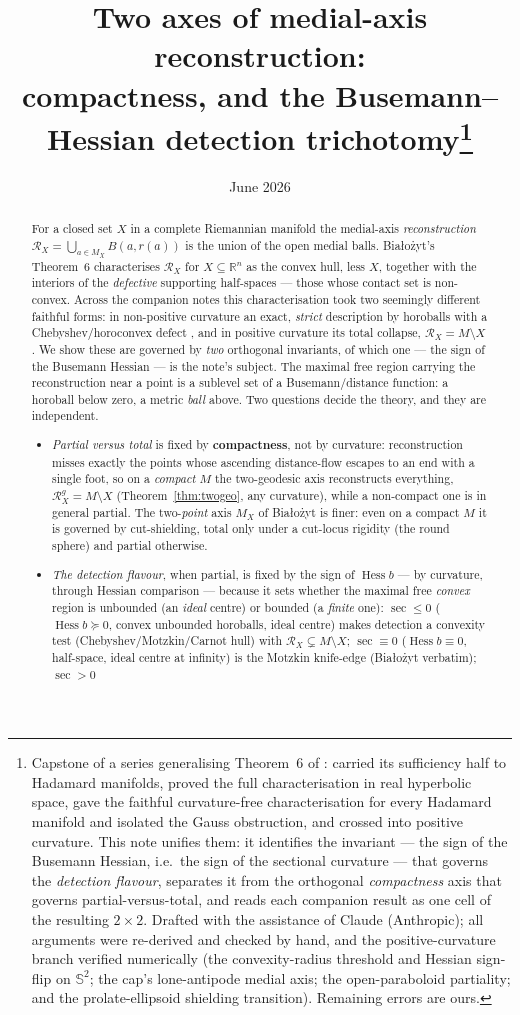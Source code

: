 \documentclass[11pt]{article}
\title{Two axes of medial-axis reconstruction:\\
compactness, and the Busemann--Hessian detection
trichotomy\thanks{Capstone of a series generalising Theorem~6 of
\cite{Bia}: \cite{R1} carried its sufficiency half to Hadamard
manifolds, \cite{R2} proved the full characterisation in real
hyperbolic space, \cite{R3} gave the faithful curvature-free
characterisation for every Hadamard manifold and isolated the Gauss
obstruction, and \cite{Sph} crossed into positive curvature. This note
unifies them: it identifies the invariant --- the sign of the
Busemann Hessian, i.e.\ the sign of the sectional curvature --- that
governs the \emph{detection flavour}, separates it from the orthogonal
\emph{compactness} axis that governs partial-versus-total, and reads each
companion result as one cell of the resulting $2\times2$. Drafted with the assistance of Claude
(Anthropic); all arguments were re-derived and checked by hand, and the
positive-curvature branch verified numerically (the convexity-radius
threshold and Hessian sign-flip on $\mathbb{S}^{2}$; the cap's lone-antipode
medial axis; the open-paraboloid partiality; and the prolate-ellipsoid
shielding transition). Remaining errors are ours.}}
\author{}
\date{June 2026}
\theoremstyle{remark}
\newcommand{\R}{\mathbb{R}}
\newcommand{\X}{X}
\newcommand{\Mx}{M_{\X}}
\newcommand{\Rx}{\mathcal{R}_{\X}}
\newcommand{\sect}{\operatorname{sec}}
\newcommand{\Hess}{\operatorname{Hess}}
\begin{document}
\maketitle

\begin{abstract}
For a closed set $\X$ in a complete Riemannian manifold the medial-axis
\emph{reconstruction} $\Rx=\bigcup_{a\in\Mx}B(a,r(a))$ is the union of
the open medial balls. Bia\l{}o\.zyt's Theorem~6 \cite{Bia} characterises
$\Rx$ for $\X\subseteq\R^{n}$ as the convex hull, less $\X$, together
with the interiors of the \emph{defective} supporting half-spaces ---
those whose contact set is non-convex. Across the companion notes this
characterisation took two seemingly different faithful forms: in
non-positive curvature an exact, \emph{strict} description by horoballs
with a Chebyshev/horoconvex defect \cite{R1,R2,R3}, and in positive
curvature its total collapse, $\Rx=M\setminus\X$ \cite{Sph}. We show these
are governed by \emph{two} orthogonal invariants, of which one --- the
sign of the Busemann Hessian --- is the note's subject. The maximal free
region carrying the reconstruction near a point is a sublevel set of a
Busemann/distance function: a horoball below zero, a metric \emph{ball}
above. Two questions decide the theory, and they are independent.
\begin{itemize}
\item \emph{Partial versus total} is fixed by \textbf{compactness}, not by
curvature: reconstruction misses exactly the points whose ascending
distance-flow escapes to an end with a single foot, so on a \emph{compact}
$M$ the two-geodesic axis reconstructs everything, $\Rx^{g}=M\setminus\X$
(Theorem~\ref{thm:twogeo}, any curvature), while a non-compact one is in
general partial. The two-\emph{point} axis $\Mx$ of Bia\l{}o\.zyt is finer:
even on a compact $M$ it is governed by cut-shielding, total only under a
cut-locus rigidity (the round sphere) and partial otherwise.
\item \emph{The detection flavour}, when partial, is fixed by the sign of
$\Hess b$ --- by curvature, through Hessian comparison --- because it sets
whether the maximal free \emph{convex} region is unbounded (an \emph{ideal}
centre) or bounded (a \emph{finite} one): $\sect\le0$ ($\Hess b\succeq0$,
convex unbounded horoballs, ideal centre) makes detection a convexity test
(Chebyshev/Motzkin/Carnot hull) with $\Rx\subsetneq M\setminus\X$;
$\sect\equiv0$ ($\Hess b\equiv0$, half-space, ideal centre at infinity) is
the Motzkin knife-edge (Bia\l{}o\.zyt verbatim); $\sect>0$

\end{itemize}
\end{abstract}
\end{document}
